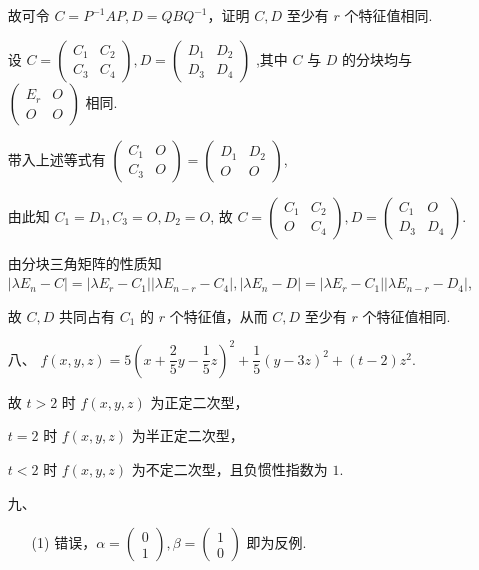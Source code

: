 \begin{enumerate}
    故可令 \(C=P^{-1}AP,D=QBQ^{-1}\)，证明 \(C,D\) 至少有 \(r\) 个特征值相同.\par
    设 \(C=\begin{pmatrix}
        C_1 & C_2\\
        C_3 & C_4
        \end{pmatrix},
        D=\begin{pmatrix}
        D_1 & D_2\\
        D_3 & D_4
        \end{pmatrix}\) ,其中 \(C\) 与 \(D\) 的分块均与 \(\begin{pmatrix}E_r & O\\O & O\end{pmatrix}\) 相同.\par
        带入上述等式有 \(\begin{pmatrix}
            C_1 & O\\
            C_3 & O
            \end{pmatrix}=
            \begin{pmatrix}
            D_1 & D_2\\
            O & O
            \end{pmatrix}\),\par
        由此知 \(C_1=D_1,C_3=O,D_2=O\), 故
        \(C=\begin{pmatrix}
        C_1 & C_2\\
        O & C_4
        \end{pmatrix},
        D=\begin{pmatrix}
        C_1 & O\\
        D_3 & D_4
        \end{pmatrix}\).\par
        由分块三角矩阵的性质知 \(|\lambda E_n-C|=|\lambda E_r-C_1||\lambda E_{n-r}-C_4|,|\lambda E_n-D|=|\lambda E_r-C_1||\lambda E_{n-r}-D_4|\),\par
        故 \(C,D\) 共同占有 \(C_1\) 的 \(r\) 个特征值，从而 \(C,D\) 至少有 \(r\) 个特征值相同.
    \item[八、] \(f(x,y,z)=5(x+\dfrac{2}{5}y-\dfrac15 z)^2+\dfrac15(y-3z)^2+(t-2)z^2\).\par
    故 \(t>2\) 时 \(f(x,y,z)\) 为正定二次型，\par
    \(t=2\) 时 \(f(x,y,z)\) 为半正定二次型，\par
    \(t<2\) 时 \(f(x,y,z)\) 为不定二次型，且负惯性指数为 \(1\).
    \item[九、]
    \begin{enumerate}
        \item[(1)] 错误，\(\alpha=\begin{pmatrix} 0 \\ 1 \end{pmatrix},\beta=\begin{pmatrix} 1 \\ 0 \end{pmatrix}\) 即为反例.

\end{enumerate}
\end{enumerate}
